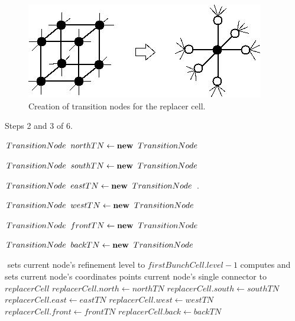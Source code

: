 \begin{figure}[!hb]
    \centering
    \includegraphics[scale=0.5]{../img/derefinement.jpg}
    \caption{Creation of transition nodes for the replacer cell.}
    \label{FIG_DEREFINING}
\end{figure}


\begin{algorithm}[!ht]
    \caption{Steps 2 and 3 of 6.}
    \small{
    \begin{algorithmic}[1]
        \State $TransitionNode \hspace{2mm} northTN \gets \textbf{new} \hspace{2mm} TransitionNode$

        \State $TransitionNode \hspace{2mm} southTN \gets \textbf{new} \hspace{2mm} TransitionNode$

        \State $TransitionNode \hspace{2mm} eastTN \gets \textbf{new} \hspace{2mm} TransitionNode$
        .

        \State $TransitionNode \hspace{2mm} westTN \gets \textbf{new} \hspace{2mm} TransitionNode$

        \State $TransitionNode \hspace{2mm} frontTN \gets \textbf{new} \hspace{2mm} TransitionNode$

        \State $TransitionNode \hspace{2mm} backTN \gets \textbf{new} \hspace{2mm} TransitionNode$

        \State $ $
            \State sets current node's refinement level to $firstBunchCell.level - 1$
            \State computes and sets current node's coordinates
            \State points current node's single connector to $replacerCell$
        \EndFor
        \State
        \State $replacerCell.north \gets northTN $
        \State $replacerCell.south \gets southTN $
        \State $replacerCell.east \gets eastTN $
        \State $replacerCell.west \gets westTN $
        \State $replacerCell.front \gets frontTN $
        \State $replacerCell.back \gets backTN $

    \end{algorithmic}
    }
    \label{STEP_2_AND_3_DEREFINEMENT}
\end{algorithm}


